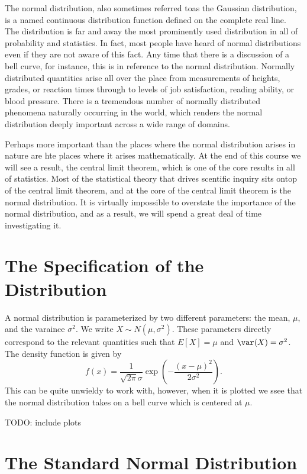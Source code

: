 \documentclass[
  letterpaper,
  DIV=11,
  numbers=noendperiod]{scrreprt}
\begin{document}
The normal distribution, also sometimes referred toas the Gaussian
distribution, is a named continuous distribution function defined on the
complete real line. The distribution is far and away the most
prominently used distribution in all of probability and statistics. In
fact, most people have heard of normal distributions even if they are
not aware of this fact. Any time that there is a discussion of a bell
curve, for instance, this is in reference to the normal distribution.
Normally distributed quantities arise all over the place from
measurements of heights, grades, or reaction times through to levels of
job satisfaction, reading ability, or blood pressure. There is a
tremendous number of normally distributed phenomena naturally occurring
in the world, which renders the normal distribution deeply important
across a wide range of domains.

Perhaps more important than the places where the normal distribution
arises in nature are hte places where it arises mathematically. At the
end of this course we will see a result, the central limit theorem,
which is one of the core results in all of statistics. Most of the
statistical theory that drives scentific inquiry sits ontop of the
central limit theorem, and at the core of the central limit theorem is
the normal distribution. It is virtually impossible to overstate the
importance of the normal distribution, and as a result, we will spend a
great deal of time investigating it.

\section{The Specification of the
Distribution}\label{the-specification-of-the-distribution}

A normal distribution is parameterized by two different parameters: the
mean, \(\mu\), and the varaince \(\sigma^2\). We write \(X\sim N(\mu,
\sigma^2)\). These parameters directly correspond to the relevant
quantities such that \(E[X] =  \mu\) and \(\var(X) = \sigma^2\). The
density function is given by
\[f(x) = \frac{1}{\sqrt{2\pi}\sigma}\exp\left(-\frac{(x-\mu)^2}{2\sigma^2}\right).\]
This can be quite unwieldy to work with, however, when it is plotted we
ssee that the normal distribution takes on a bell curve which is
centered at \(\mu\).

TODO: include plots

\section{The Standard Normal
Distribution}\label{the-standard-normal-distribution}
\end{document}
